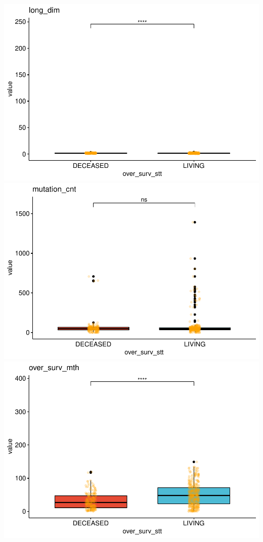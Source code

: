 \documentclass[]{article}
\begin{document}
\includegraphics{figs/render-unnamed-chunk-11-4.pdf}
\includegraphics{figs/render-unnamed-chunk-11-5.pdf}
\includegraphics{figs/render-unnamed-chunk-11-6.pdf}
\end{document}
